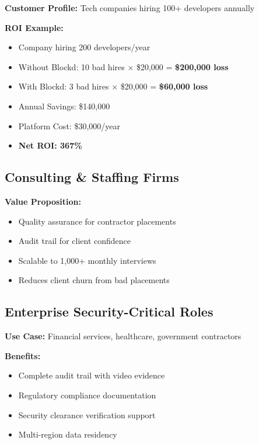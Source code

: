 \documentclass[11pt,letterpaper]{article}
\begin{document}
\textbf{Customer Profile:} Tech companies hiring 100+ developers annually

\textbf{ROI Example:}
\begin{itemize}[noitemsep]
    \item Company hiring 200 developers/year
    \item Without Blockd: 10 bad hires × \$20,000 = \textbf{\$200,000 loss}
    \item With Blockd: 3 bad hires × \$20,000 = \textbf{\$60,000 loss}
    \item Annual Savings: \$140,000
    \item Platform Cost: \$30,000/year
    \item \textbf{Net ROI: 367\%}
\end{itemize}

\subsection{Consulting \& Staffing Firms}

\textbf{Value Proposition:}
\begin{itemize}[noitemsep]
    \item Quality assurance for contractor placements
    \item Audit trail for client confidence
    \item Scalable to 1,000+ monthly interviews
    \item Reduces client churn from bad placements
\end{itemize}

\subsection{Enterprise Security-Critical Roles}

\textbf{Use Case:} Financial services, healthcare, government contractors

\textbf{Benefits:}
\begin{itemize}[noitemsep]
    \item Complete audit trail with video evidence
    \item Regulatory compliance documentation
    \item Security clearance verification support
    \item Multi-region data residency
\end{itemize}

\end{document}
